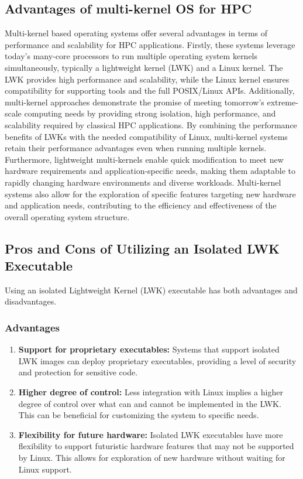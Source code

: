 \documentclass[16pt,a4paper]{article}
\begin{document}
\subsection{Advantages of multi-kernel OS for HPC}
Multi-kernel based operating systems offer several advantages in terms of performance and scalability for HPC applications. Firstly, these systems leverage today's many-core processors to run multiple operating system kernels simultaneously, typically a lightweight kernel (LWK) and a Linux kernel. The LWK provides high performance and scalability, while the Linux kernel ensures compatibility for supporting tools and the full POSIX/Linux APIs. Additionally, multi-kernel approaches demonstrate the promise of meeting tomorrow's extreme-scale computing needs by providing strong isolation, high performance, and scalability required by classical HPC applications. By combining the performance benefits of LWKs with the needed compatibility of Linux, multi-kernel systems retain their performance advantages even when running multiple kernels. Furthermore, lightweight multi-kernels enable quick modification to meet new hardware requirements and application-specific needs, making them adaptable to rapidly changing hardware environments and diverse workloads. Multi-kernel systems also allow for the exploration of specific features targeting new hardware and application needs, contributing to the efficiency and effectiveness of the overall operating system structure.

\subsection{Pros and Cons of Utilizing an Isolated LWK Executable}
Using an isolated Lightweight Kernel (LWK) executable has both advantages and disadvantages.

\subsubsection{Advantages}
\begin{enumerate}
  \item \textbf{Support for proprietary executables:} Systems that support isolated LWK images can deploy proprietary executables, providing a level of security and protection for sensitive code.
  \item \textbf{Higher degree of control:} Less integration with Linux implies a higher degree of control over what can and cannot be implemented in the LWK. This can be beneficial for customizing the system to specific needs.
  \item \textbf{Flexibility for future hardware:} Isolated LWK executables have more flexibility to support futuristic hardware features that may not be supported by Linux. This allows for exploration of new hardware without waiting for Linux support.
\end{enumerate}
\end{document}
